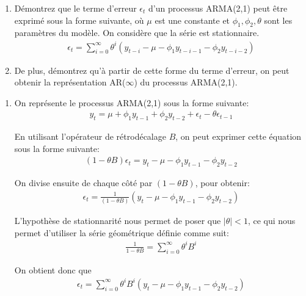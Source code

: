 \begin{exercice}
  \begin{enumerate}
\item Démontrez que le terme d'erreur $\epsilon_t$ d'un processus ARMA(2,1) peut être exprimé sous la forme suivante, où $\mu$ est une constante et $\phi_1, \phi_2, \theta$ sont les paramètres du modèle. On considère que la série est stationnaire.
\begin{align*}
  \epsilon_t = \sum_{i=0}^{\infty} \theta^i \left(y_{t-i} - \mu - \phi_1 y_{t-i-1} - \phi_2 y_{t-i-2} \right)
\end{align*}

\item De plus, démontrez qu'à partir de cette forme du terme d'erreur, on peut obtenir la représentation AR($\infty$) du processus ARMA(2,1).
\end{enumerate}
\begin{sol}
  \begin{enumerate}
\item
  On représente le processus ARMA(2,1) sous la forme suivante:
  \begin{align*}
    y_t = \mu + \phi_1 y_{t-1} + \phi_2 y_{t-2} + \epsilon_t - \theta\epsilon_{t-1}
  \end{align*}
  
  En utilisant l'opérateur de rétrodécalage $B$, on peut exprimer cette équation sous la forme suivante:
  \begin{align*}
    (1-\theta B)\epsilon_t = y_t - \mu - \phi_1 y_{t-1} - \phi_2 y_{t-2}
  \end{align*}
  
  On divise ensuite de chaque côté par $(1-\theta B)$, pour obtenir:
  \begin{align*}
    \epsilon_t = \frac{1}{(1-\theta B)} \left(y_t - \mu - \phi_1 y_{t-1} - \phi_2 y_{t-2}\right)
  \end{align*}
  
  L'hypothèse de stationnarité nous permet de poser que $| \theta | < 1$, ce qui nous permet d'utiliser la série géométrique définie comme suit:
  \begin{align*}
    \frac{1}{1-\theta B} = \sum_{i=0}^{\infty} \theta^i B^i
  \end{align*}
  
  On obtient donc que 
  \begin{align*}
    \epsilon_t = \sum_{i=0}^{\infty} \theta^i B^i \left(y_t - \mu - \phi_1 y_{t-1} - \phi_2 y_{t-2}\right)
  \end{align*}
  

\end{enumerate}
\end{sol}
\end{exercice}
